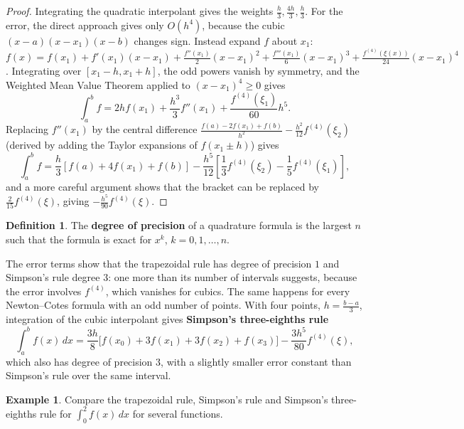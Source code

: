 \documentclass[11pt,a4paper]{article}
\numberwithin{equation}{section}
\theoremstyle{definition}
\newtheorem{defn}[thm]{Definition}
\newtheorem{exa}[thm]{Example}
\begin{document}
\begin{proof}
Integrating the quadratic interpolant gives the weights $\frac h3,\frac{4h}3,\frac h3$. For the error, the direct approach gives only $O(h^4)$,
because the cubic $(x-a)(x-x_1)(x-b)$ changes sign. Instead expand $f$ about $x_1$:
$f(x) = f(x_1)+f'(x_1)(x-x_1)+\frac{f''(x_1)}{2}(x-x_1)^2+\frac{f'''(x_1)}{6}(x-x_1)^3+\frac{f^{(4)}(\xi(x))}{24}(x-x_1)^4$. Integrating over
$[x_1-h,x_1+h]$, the odd powers vanish by symmetry, and the Weighted Mean Value Theorem applied to $(x-x_1)^4\geq0$ gives
$$\int_a^bf = 2hf(x_1)+\frac{h^3}{3}f''(x_1)+\frac{f^{(4)}(\xi_1)}{60}h^5 .$$
Replacing $f''(x_1)$ by the central difference $\frac{f(a)-2f(x_1)+f(b)}{h^2}-\frac{h^2}{12}f^{(4)}(\xi_2)$ (derived by adding the Taylor expansions of
$f(x_1\pm h)$) gives
$$\int_a^bf = \frac h3[f(a)+4f(x_1)+f(b)]-\frac{h^5}{12}\left[\frac13f^{(4)}(\xi_2)-\frac15f^{(4)}(\xi_1)\right],$$
and a more careful argument shows that the bracket can be replaced by $\frac{2}{15}f^{(4)}(\xi)$, giving $-\frac{h^5}{90}f^{(4)}(\xi)$.
\end{proof}

\begin{defn}
The \textbf{degree of precision} of a quadrature formula is the largest $n$ such that the formula is exact for $x^k$, $k = 0,1,\dots,n$.
\end{defn}

The error terms show that the trapezoidal rule has degree of precision $1$ and Simpson's rule degree $3$: one more than its number of
intervals suggests, because the error involves $f^{(4)}$, which vanishes for cubics. The same happens for every Newton--Cotes formula
with an odd number of points. With four points, $h = \frac{b-a}3$, integration of the cubic interpolant gives \textbf{Simpson's three-eighths
rule}
$$\int_a^bf(x)\,dx = \frac{3h}{8}\bigl[f(x_0)+3f(x_1)+3f(x_2)+f(x_3)\bigr]-\frac{3h^5}{80}f^{(4)}(\xi),$$
which also has degree of precision $3$, with a slightly smaller error constant than Simpson's rule over the same interval.

\begin{exa}
\label{exa:newtoncotes}
Compare the trapezoidal rule, Simpson's rule and Simpson's three-eighths rule for $\int_0^2f(x)\,dx$ for several functions.
\end{exa}
\end{document}
